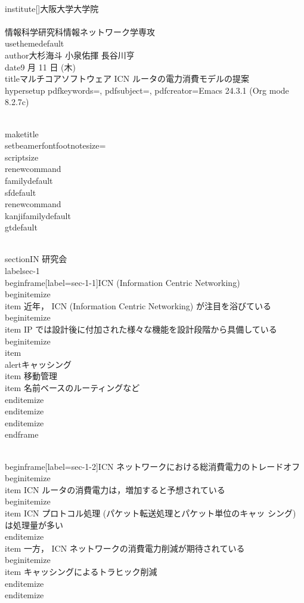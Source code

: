{\\institute[]{大阪大学大学院\\\\情報科学研究科情報ネットワーク学専攻}
\\usetheme{default}
\\author{大杉海斗 小泉佑揮 長谷川亨}
\\date{9 月 11 日 (木)}
\\title{マルチコアソフトウェア ICN ルータの電力消費モデルの提案}
\\hypersetup{
  pdfkeywords={},
  pdfsubject={},
  pdfcreator={Emacs 24.3.1 (Org mode 8.2.7c)}}
\

\\maketitle
\\setbeamerfont{footnote}{size=\\scriptsize}
\\renewcommand{\\familydefault}{\\sfdefault}
\\renewcommand{\\kanjifamilydefault}{\\gtdefault}

\\section{IN 研究会}
\\label{sec-1}
\\begin{frame}[label=sec-1-1]{ICN (Information Centric Networking)}
\\begin{itemize}
\\item 近年， ICN (Information Centric Networking) が注目を浴びている
\\begin{itemize}
\\item IP では設計後に付加された様々な機能を設計段階から具備している
\\begin{itemize}
\\item \\alert{キャッシング}
\\item 移動管理
\\item 名前ベースのルーティングなど
\\end{itemize}
\\end{itemize}
\\end{itemize}
\\end{frame}

\\begin{frame}[label=sec-1-2]{ICN ネットワークにおける総消費電力のトレードオフ}
\\begin{itemize}
\\item ICN ルータの消費電力は，増加すると予想されている
\\begin{itemize}
\\item ICN プロトコル処理 (パケット転送処理とパケット単位のキャッ
シング) は処理量が多い
\\end{itemize}
\\item 一方， ICN ネットワークの消費電力削減が期待されている
\\begin{itemize}
\\item キャッシングによるトラヒック削減
\\end{itemize}
\\end{itemize}

}

